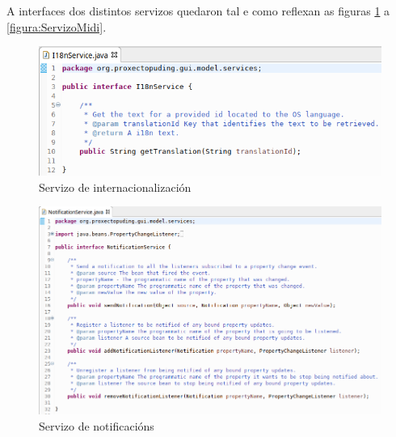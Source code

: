    A interfaces dos distintos servizos quedaron tal e como reflexan as figuras
   \ref{figura:ServizoI18n} a \ref{figura:ServizoMidi}. \\
   
   \begin{figure}[htbp]
    \centering
    \includegraphics[scale=0.6, keepaspectratio=true]{./imagenes/servizo-i18n.png}
    \caption{Servizo de internacionalización}
    \label{figura:ServizoI18n}
   \end{figure}
   
   \begin{figure}[htbp]
    \centering
    \includegraphics[scale=0.6, keepaspectratio=true]{./imagenes/servizo-notificacions.png}
    \caption{Servizo de notificacións}
    \label{figura:ServizoNotificacions}
   \end{figure}
   
